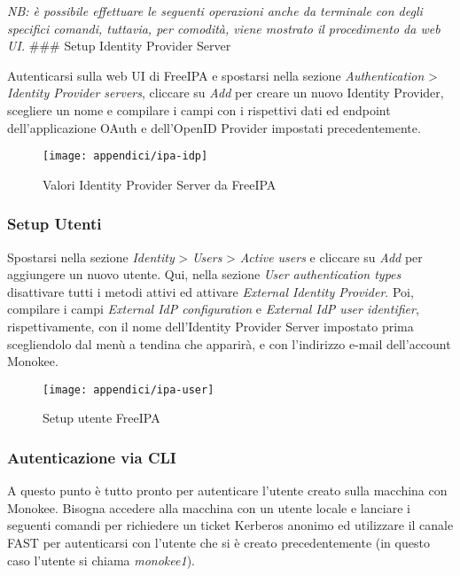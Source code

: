 \emph{NB: è possibile effettuare le seguenti operazioni anche da
terminale con degli specifici comandi, tuttavia, per comodità, viene
mostrato il procedimento da web UI.} \#\#\# Setup Identity Provider
Server

Autenticarsi sulla web UI di FreeIPA e spostarsi nella sezione
\emph{Authentication} \textgreater{} \emph{Identity Provider servers},
cliccare su \emph{Add} per creare un nuovo Identity Provider, scegliere
un nome e compilare i campi con i rispettivi dati ed endpoint
dell'applicazione OAuth e dell'OpenID Provider impostati
precedentemente.

\begin{figure}[!h] 
  \centering 
  \texttt{[image: appendici/ipa-idp]} 
  \caption{Valori Identity Provider Server da FreeIPA}
\end{figure}


\hypertarget{setup-utenti}{%
\subsubsection{Setup Utenti}\label{setup-utenti}}

Spostarsi nella sezione \emph{Identity} \textgreater{} \emph{Users}
\textgreater{} \emph{Active users} e cliccare su \emph{Add} per
aggiungere un nuovo utente. Qui, nella sezione \emph{User authentication
types} disattivare tutti i metodi attivi ed attivare \emph{External
Identity Provider}. Poi, compilare i campi \emph{External IdP
configuration} e \emph{External IdP user identifier}, rispettivamente,
con il nome dell'Identity Provider Server impostato prima scegliendolo
dal menù a tendina che apparirà, e con l'indirizzo e-mail dell'account
Monokee.

\begin{figure}[!h] 
  \centering 
  \texttt{[image: appendici/ipa-user]} 
  \caption{Setup utente FreeIPA}
\end{figure}



\hypertarget{autenticazione-via-cli}{%
\subsubsection{Autenticazione via CLI}\label{autenticazione-via-cli}}
A questo punto è tutto pronto per autenticare l'utente creato sulla
macchina con Monokee. Bisogna accedere alla macchina con un utente
locale e lanciare i seguenti comandi per richiedere un ticket Kerberos
anonimo ed utilizzare il canale FAST per autenticarsi con l'utente che
si è creato precedentemente (in questo caso l'utente si chiama
\emph{monokee1}).

